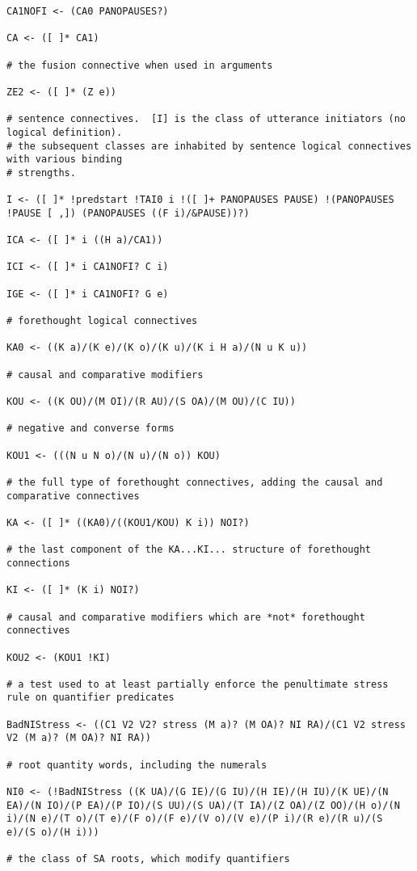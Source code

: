 \documentclass{article}
\begin{document}
\begin{verbatim}
CA1NOFI <- (CA0 PANOPAUSES?)

CA <- ([ ]* CA1)

# the fusion connective when used in arguments

ZE2 <- ([ ]* (Z e))

# sentence connectives.  [I] is the class of utterance initiators (no logical definition).
# the subsequent classes are inhabited by sentence logical connectives with various binding
# strengths.

I <- ([ ]* !predstart !TAI0 i !([ ]+ PANOPAUSES PAUSE) !(PANOPAUSES !PAUSE [ ,]) (PANOPAUSES ((F i)/&PAUSE))?)

ICA <- ([ ]* i ((H a)/CA1))

ICI <- ([ ]* i CA1NOFI? C i)

IGE <- ([ ]* i CA1NOFI? G e)

# forethought logical connectives

KA0 <- ((K a)/(K e)/(K o)/(K u)/(K i H a)/(N u K u))

# causal and comparative modifiers

KOU <- ((K OU)/(M OI)/(R AU)/(S OA)/(M OU)/(C IU))

# negative and converse forms

KOU1 <- (((N u N o)/(N u)/(N o)) KOU)

# the full type of forethought connectives, adding the causal and comparative connectives

KA <- ([ ]* ((KA0)/((KOU1/KOU) K i)) NOI?)

# the last component of the KA...KI... structure of forethought connections

KI <- ([ ]* (K i) NOI?)

# causal and comparative modifiers which are *not* forethought connectives

KOU2 <- (KOU1 !KI)

# a test used to at least partially enforce the penultimate stress rule on quantifier predicates

BadNIStress <- ((C1 V2 V2? stress (M a)? (M OA)? NI RA)/(C1 V2 stress V2 (M a)? (M OA)? NI RA))

# root quantity words, including the numerals

NI0 <- (!BadNIStress ((K UA)/(G IE)/(G IU)/(H IE)/(H IU)/(K UE)/(N EA)/(N IO)/(P EA)/(P IO)/(S UU)/(S UA)/(T IA)/(Z OA)/(Z OO)/(H o)/(N i)/(N e)/(T o)/(T e)/(F o)/(F e)/(V o)/(V e)/(P i)/(R e)/(R u)/(S e)/(S o)/(H i)))

# the class of SA roots, which modify quantifiers


\end{verbatim}
\end{document}
